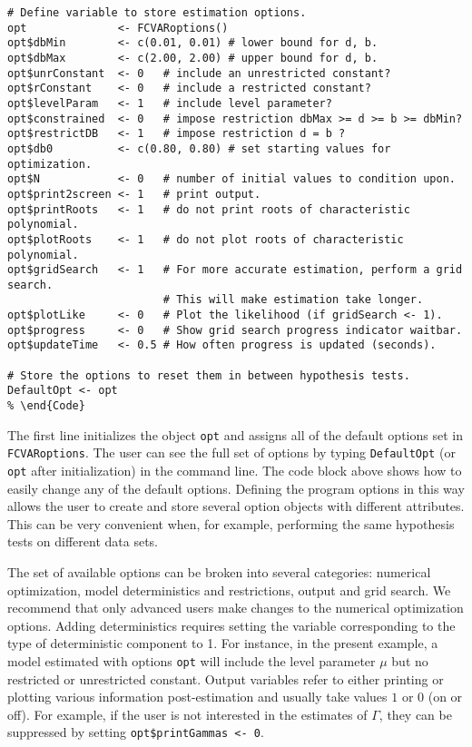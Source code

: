 \documentclass[11pt,letterpaper]{paper}
\newcommand{\pkg}[1]{{\normalfont\fontseries{b}\selectfont #1}}
\begin{document}
\begin{lstlisting}[frame=single,caption={Choosing estimation options}, label = intl2]
# Define variable to store estimation options.
opt              <- FCVARoptions() 
opt$dbMin        <- c(0.01, 0.01) # lower bound for d, b.
opt$dbMax        <- c(2.00, 2.00) # upper bound for d, b.
opt$unrConstant  <- 0   # include an unrestricted constant? 
opt$rConstant    <- 0   # include a restricted constant? 
opt$levelParam   <- 1   # include level parameter? 
opt$constrained  <- 0   # impose restriction dbMax >= d >= b >= dbMin? 
opt$restrictDB   <- 1   # impose restriction d = b ? 
opt$db0          <- c(0.80, 0.80) # set starting values for optimization.
opt$N            <- 0   # number of initial values to condition upon.
opt$print2screen <- 1   # print output.
opt$printRoots   <- 1   # do not print roots of characteristic polynomial.
opt$plotRoots    <- 1   # do not plot roots of characteristic polynomial.
opt$gridSearch   <- 1   # For more accurate estimation, perform a grid search.
                        # This will make estimation take longer.
opt$plotLike     <- 0   # Plot the likelihood (if gridSearch <- 1).
opt$progress     <- 0   # Show grid search progress indicator waitbar.
opt$updateTime   <- 0.5 # How often progress is updated (seconds).

# Store the options to reset them in between hypothesis tests.
DefaultOpt <- opt 
% \end{Code}
\end{lstlisting}

The first line initializes the object \verb|opt| and assigns all of the default options set in \verb|FCVARoptions|. 
The user can see the full set of options by typing \verb|DefaultOpt| (or \verb|opt| after initialization) in the command line. %
The code block above 
shows how to easily change any of the default options. Defining the program options in this way allows the user to create and store several option objects with different attributes. This can be very convenient when, for example, performing the same hypothesis tests on different data sets. 

The set of available options can be broken into several categories: numerical optimization, model deterministics and restrictions, output and grid search.
We recommend that only advanced users make changes to the numerical optimization options. Adding deterministics requires setting the variable corresponding to the type of deterministic component to 1. For instance, in the present example, a model estimated with options \verb|opt| will include the level parameter $\mu$ but no restricted or unrestricted constant. Output variables refer to either printing or plotting various information post-estimation and usually take values $1$ or $0$ (on or off). For example, if the user is not interested in the estimates of $\Gamma$, they can be suppressed by setting \verb|opt$printGammas <- 0|.
\end{document}
